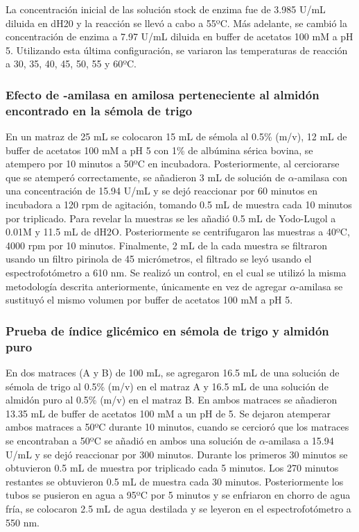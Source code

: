 \documentclass{article}
\begin{document}
La concentración inicial de las solución stock de enzima fue de 3.985 U/mL diluida en dH20 y la reacción se llevó a cabo a 55ºC. Más adelante, se cambió la concentración de enzima a 7.97 U/mL diluida en buffer de acetatos 100 mM a pH 5. Utilizando esta última configuración, se variaron  las temperaturas de reacción a 30, 35, 40, 45, 50, 55 y  60ºC.

\subsubsection{Efecto de \bm{$\alpha$}-amilasa en amilosa perteneciente al almidón encontrado en la sémola de trigo}
	
En un matraz de 25 mL se colocaron 15 mL de sémola al 0.5\% (m/v), 12 mL de buffer de acetatos 100 mM a pH 5 con 1\% de albúmina sérica bovina, se atempero por 10 minutos a 50ºC en incubadora. Posteriormente, al cerciorarse que se atemperó correctamente, se añadieron 3 mL de solución de $\alpha$-amilasa con una concentración de 15.94 U/mL y se dejó reaccionar por 60 minutos en incubadora a 120 rpm de agitación, tomando 0.5 mL de muestra cada 10 minutos por triplicado. Para revelar la muestras se les añadió 0.5 mL de Yodo-Lugol a 0.01M y 11.5 mL de dH2O. Posteriormente se centrifugaron las muestras a 40ºC, 4000 rpm por 10 minutos. Finalmente,  2 mL de la cada muestra se filtraron usando un filtro pirinola de 45 micrómetros, el filtrado se leyó usando el espectrofotómetro a 610 nm. Se realizó un control, en el cual se utilizó la misma metodología descrita anteriormente, únicamente en vez de agregar $\alpha$-amilasa se sustituyó el mismo volumen por buffer de acetatos 100 mM a pH 5.

\subsubsection{Prueba de índice glicémico en sémola de trigo y almidón puro}
En dos matraces (A y B) de 100 mL, se agregaron 16.5 mL de una solución de sémola de trigo al 0.5\% (m/v) en el matraz A y 16.5 mL de una solución de almidón puro al 0.5\% (m/v) en el matraz B. En ambos matraces se añadieron 13.35 mL de buffer de acetatos 100 mM a un pH de 5. Se dejaron atemperar ambos matraces a 50ºC durante 10 minutos, cuando se cercioró que los matraces se encontraban a 50ºC se añadió en ambos una solución de $\alpha$-amilasa a 15.94 U/mL y se dejó reaccionar por 300 minutos. Durante los primeros 30 minutos se obtuvieron 0.5 mL de muestra por triplicado cada 5 minutos. Los 270 minutos restantes se obtuvieron 0.5 mL de muestra cada 30 minutos. Posteriormente los tubos se pusieron en agua a 95ºC por 5 minutos y se enfriaron en chorro de agua fría, se colocaron 2.5 mL de agua destilada y se leyeron en el espectrofotómetro a 550 nm.
\end{document}
